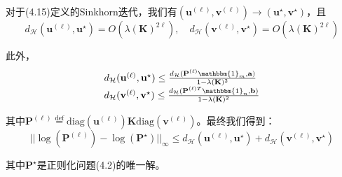 \documentclass[cn,10pt,math=newtx,citestyle=gb7714-2015,bibstyle=gb7714-2015]{elegantbook}
\begin{document}
\begin{theorem}
对于(4.15)定义的Sinkhorn迭代，我们有$(\mathbf{u}^{(\ell)},\mathbf{v}^{(\ell)})\to (\mathbf{u}^\star, \mathbf{v}^\star)$，且
\begin{equation}
    \label{4.22}
    d_\mathcal{H}(\mathbf{u}^{(\ell)},\mathbf{u}^\star) = O(\lambda(\mathbf{K})^{2\ell}), \quad d_\mathcal{H}(\mathbf{v}^{(\ell)},\mathbf{v}^\star) = O(\lambda(\mathbf{K})^{2\ell})
\end{equation}

此外，
\begin{equation}
    \label{4.23}
    \renewcommand{\arraystretch}{1.5}
    \begin{array}{l}
    d_\mathcal{H}(\mathbf{u}^{(\ell)},\mathbf{u}^\star) \leq \frac{d_\mathcal{H}(\mathbf{P}^{(\ell)}\mathbbm{1}_m, \mathbf{a})}{1-\lambda(\mathbf{K})^2} \\ 
    d_\mathcal{H}(\mathbf{v}^{(\ell)},\mathbf{v}^\star) \leq \frac{d_\mathcal{H}(\mathbf{P}^{(\ell)T}\mathbbm{1}_n, \mathbf{b})}{1-\lambda(\mathbf{K})^2}
    \end{array}
\end{equation}

其中$\mathbf{P}^{(\ell)}\overset{\text{def}}{=}\text{diag}(\mathbf{u}^{(\ell)}) \mathbf{K} \text{diag}(\mathbf{v}^{(\ell)})$。最终我们得到：
\begin{equation}
    \label{4.24}
    ||\log(\mathbf{P}^{(\ell)})-\log(\mathbf{P}^\star)||_\infty \leq d_\mathcal{H}(\mathbf{u}^{(\ell)},\mathbf{u}^\star) + d_\mathcal{H}(\mathbf{v}^{(\ell)},\mathbf{v}^\star)
\end{equation}

其中$\mathbf{P}^\star$是正则化问题(4.2)的唯一解。
\end{theorem}
\end{document}
